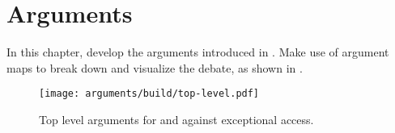 \chapter{Arguments}
\label{chap-arguments}

In this chapter, develop the arguments introduced in . Make use of argument maps to break down
and visualize the debate, as shown in .

\begin{figure}[h]
    \centering\CaptionFontSize
    \texttt{[image: arguments/build/top-level.pdf]}
    \caption[Argument: Top Level]{Top level arguments for and against exceptional access.}
    \label{fig-args-top-level}
\end{figure}
